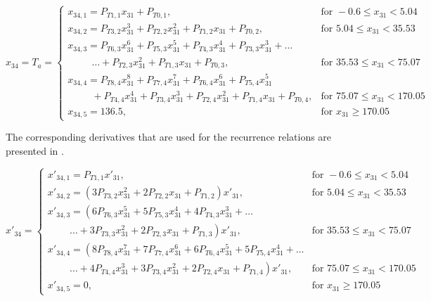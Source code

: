 \begin{equation}\label{eq:tempCondAux}
x_{34}=T_{a}=\begin{cases}
x_{34,1}=P_{T 1,1}x_{31}+P_{T 0,1}, & \text{for } -0.6 \leq x_{31} < 5.04  \\
x_{34,2}=P_{T 3,2}x_{31}^{3}+P_{T 2,2}x_{31}^{2}+P_{T 1,2}x_{31}+P_{T 0,2}, &  \text{for } 5.04 \leq x_{31} < 35.53   \\
x_{34,3}=P_{T 6,3}x_{31}^{6}+P_{T 5,3}x_{31}^{5}+P_{T 4,3}x_{31}^{4}+P_{T 3,3}x_{31}^{3}+ \dots \\
\qquad\ \ \dotsc +P_{T 2,3}x_{31}^{2}+P_{T 1,3}x_{31}+P_{T 0,3}, &  \text{for } 35.53 \leq x_{31} < 75.07   \\
x_{34,4}=P_{T 8,4}x_{31}^{8}+P_{T 7,4}x_{31}^{7}+P_{T 6,4}x_{31}^{6}+P_{T 5,4}x_{31}^{5} \\
\qquad\ \ +P_{T 4,4}x_{31}^{4}+P_{T 3,4}x_{31}^{3}+P_{T 2,4}x_{31}^{2}+P_{T 1,4}x_{31}+P_{T 0,4}, &  \text{for } 75.07 \leq x_{31} < 170.05   \\
x_{34,5}=136.5, &  \text{for }  x_{31} \geq 170.05   
\end{cases}
\end{equation}

\noindent
The corresponding derivatives that are used for the recurrence relations are presented in .

\begin{equation}\label{eq:TCondDerAux}
x'_{34}=\begin{cases}
x'_{34,1}=P_{T 1,1}x'_{31}, & \text{for } -0.6 \leq x_{31} < 5.04  \\
x'_{34,2}=\left(3P_{T 3,2}x_{31}^{2}+2P_{T 2,2}x_{31}+P_{T 1,2}\right)x'_{31}, &  \text{for } 5.04\leq x_{31} < 35.53   \\
x'_{34,3}=\left(6 P_{T 6,3}x_{31}^{5}+5P_{T 5,3}x_{31}^{4}+4P_{T 4,3}x_{31}^{3}+ \dots
\right. \\
\qquad\  \left. \dotsc +3P_{T 3,3}x_{31}^{2}+2P_{T 2,3}x_{31}+P_{T 1,3}\right)x'_{31}, &  \text{for } 35.53\leq x_{31} < 75.07   \\
x'_{34,4}=\left(8 P_{T 8,4}x_{31}^{7}+7P_{T 7,4}x_{31}^{6}+6P_{T 6,4}x_{31}^{5}
+5P_{T 5,4}x_{31}^{4}+ \dots \right. \\
\qquad\  \left. \dotsc +4P_{T 4,4}x_{31}^{3}+3P_{T 3,4}x_{31}^{2}+2P_{T 2,4}x_{31}+P_{T 1,4}\right)x'_{31}, &  \text{for } 75.07\leq x_{31} < 170.05   \\
x'_{34,5}=0, &  \text{for }  x_{31} \geq 170.05   
\end{cases}
\end{equation}


